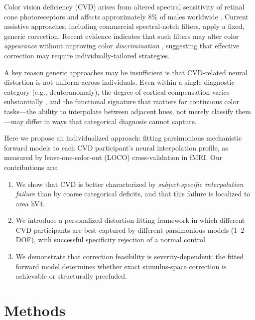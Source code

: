\documentclass{article}
\begin{document}
Color vision deficiency (CVD) arises from altered spectral sensitivity of retinal cone photoreceptors and affects approximately 8\% of males worldwide \cite{placeholder_machado2009}.
Current assistive approaches, including commercial spectral-notch filters, apply a fixed, generic correction.
Recent evidence indicates that such filters may alter color \emph{appearance} without improving color \emph{discrimination} \cite{placeholder_somers2024}, suggesting that effective correction may require individually-tailored strategies.

A key reason generic approaches may be insufficient is that CVD-related neural distortion is not uniform across individuals.
Even within a single diagnostic category (e.g., deuteranomaly), the degree of cortical compensation varies substantially \cite{placeholder_tregillus2021}, and the functional signature that matters for continuous color tasks---the ability to interpolate between adjacent hues, not merely classify them---may differ in ways that categorical diagnosis cannot capture.

Here we propose an individualized approach: fitting parsimonious mechanistic forward models to each CVD participant's neural interpolation profile, as measured by leave-one-color-out (LOCO) cross-validation in fMRI.
Our contributions are:
\begin{enumerate}
    \item We show that CVD is better characterized by \emph{subject-specific interpolation failure} than by coarse categorical deficits, and that this failure is localized to area hV4.
    \item We introduce a personalized distortion-fitting framework in which different CVD participants are best captured by different parsimonious models (1--2 DOF), with successful specificity rejection of a normal control.
    \item We demonstrate that correction feasibility is severity-dependent: the fitted forward model determines whether exact stimulus-space correction is achievable or structurally precluded.
\end{enumerate}

\section{Methods}
\label{sec:methods}
\end{document}
